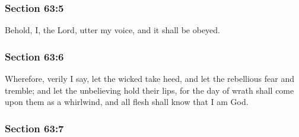 
	\subsubsection{Section 63:5} %
		\label{DC63-5}

		Behold, I, the Lord, utter my voice, and it shall be obeyed.


	\subsubsection{Section 63:6} %
		\label{DC63-6}

		Wherefore, verily I say, let the wicked take heed, and let the rebellious fear and tremble; and let the unbelieving hold their lips, for the day of wrath shall come upon them as a whirlwind, and all flesh shall know that I am God.


	\subsubsection{Section 63:7} %
		\label{DC63-7}

